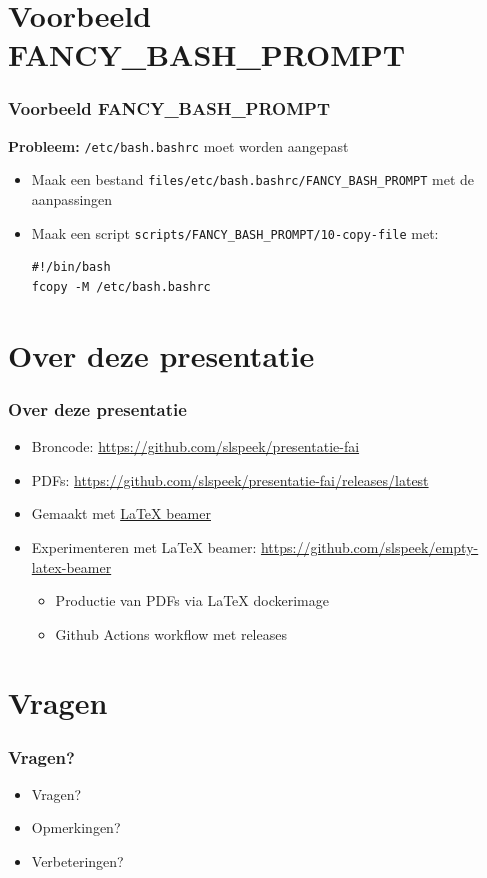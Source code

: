 \documentclass{beamer}
\begin{document}
\section{Voorbeeld FANCY\_BASH\_PROMPT}
\begin{frame}[fragile]
\frametitle{Voorbeeld FANCY\_BASH\_PROMPT}
 
\textbf{Probleem:} \texttt{/etc/bash.bashrc} moet worden aangepast

\begin{itemize}
  \item<2-> Maak een bestand \texttt{files/etc/bash.bashrc/FANCY\_BASH\_PROMPT} met de aanpassingen
  \item<3-> Maak een script \texttt{scripts/FANCY\_BASH\_PROMPT/10-copy-file} met:
  \begin{verbatim}#!/bin/bash
fcopy -M /etc/bash.bashrc
  \end{verbatim} 
   
\end{itemize}
\end{frame}

\section{Over deze presentatie}

\begin{frame}
\frametitle{Over deze presentatie}
\begin{itemize}
  \item Broncode: \url{https://github.com/slspeek/presentatie-fai}
  \item PDFs: \url{https://github.com/slspeek/presentatie-fai/releases/latest}
  \item Gemaakt met \href{https://nl.mirrors.cicku.me/ctan/macros/latex/contrib/beamer/doc/beameruserguide.pdf}{\LaTeX{} beamer}
  \item Experimenteren met \LaTeX{} beamer: \url{https://github.com/slspeek/empty-latex-beamer}
  \begin{itemize}
    \item Productie van PDFs via \LaTeX{} dockerimage
    \item Github Actions workflow met releases
  \end{itemize}
\end{itemize}
\end{frame}

\section{Vragen}
\begin{frame}
\frametitle{Vragen?}
\begin{itemize}
  \item Vragen?
  \item<2-> Opmerkingen?
  \item<3-> Verbeteringen?
\end{itemize}
\end{frame}
\end{document}
